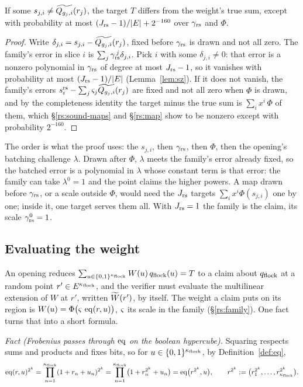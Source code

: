 \begin{lemma}\label{lem:rs-family}
If some $s_{j,i}\neq\widetilde{Q_{g_j,i}}(r_j)$, the target $T$ differs from the weight's true sum, except with probability at most $(J_{\mathrm{rs}}-1)/|E|+2^{-160}$ over $\gamma_{\mathrm{rs}}$ and $\Phi$.
\end{lemma}
\begin{proof}
Write $\delta_{j,i}=s_{j,i}-\widetilde{Q_{g_j,i}}(r_j)$, fixed before $\gamma_{\mathrm{rs}}$ is drawn and not all zero. The family's error in slice $i$ is $\sum_j\gamma_{\mathrm{rs}}^{\,j}\delta_{j,i}$. Pick $i$ with some $\delta_{j,i}\neq0$: that error is a nonzero polynomial in $\gamma_{\mathrm{rs}}$ of degree at most $J_{\mathrm{rs}}-1$, so it vanishes with probability at most $(J_{\mathrm{rs}}-1)/|E|$ (Lemma~\ref{lem:sz}). If it does not vanish, the family's errors $s^{\mathrm{rs}}_{i}-\sum_j\varsigma_j\widetilde{Q_{g_j,i}}(r_j)$ are fixed and not all zero when $\Phi$ is drawn, and by the completeness identity the target minus the true sum is $\sum_ix^i\,\Phi$ of them, which \S\ref{rs:sound-maps} and \S\ref{rs:map} show to be nonzero except with probability $2^{-160}$.
\end{proof}

The order is what the proof uses: the $s_{j,i}$, then $\gamma_{\mathrm{rs}}$, then $\Phi$, then the opening's batching challenge $\lambda$. Drawn after $\Phi$, $\lambda$ meets the family's error already fixed, so the batched error is a polynomial in $\lambda$ whose constant term is that error: the family can take $\lambda^0=1$ and the point claims the higher powers. A map drawn before $\gamma_{\mathrm{rs}}$, or a scale outside $\Phi$, would need the $J_{\mathrm{rs}}$ targets $\sum_ix^i\Phi(s_{j,i})$ one by one; inside it, one target serves them all. With $J_{\mathrm{rs}}=1$ the family is the claim, its scale $\gamma_{\mathrm{rs}}^0=1$.

\subsection{Evaluating the weight}\label{rs:weight}

An opening reduces $\sum_{u\in\{0,1\}^{\kappa_{\mathrm{flock}}}}W(u)\,q_{\mathrm{flock}}(u)=T$ to a claim about $q_{\mathrm{flock}}$ at a random point $r'\in E^{\kappa_{\mathrm{flock}}}$, and the verifier must evaluate the multilinear extension of $W$ at $r'$, written $\widetilde{W}(r')$, by itself. The weight a claim puts on its region is $W(u)=\Phi\bigl(\varsigma\,\operatorname{eq}(r,u)\bigr)$, $\varsigma$ its scale in the family (\S\ref{rs:family}). One fact turns that into a short formula.

\emph{Fact (Frobenius passes through $\operatorname{eq}$ on the boolean hypercube).} Squaring respects sums and products and fixes bits, so for $u\in\{0,1\}^{\kappa_{\mathrm{flock}}}$, by Definition~\ref{def:eq},
\[
\operatorname{eq}(r,u)^{2^k}=\prod_{n=1}^{\kappa_{\mathrm{flock}}}(1+r_n+u_n)^{2^k}=\prod_{n=1}^{\kappa_{\mathrm{flock}}}\bigl(1+r_n^{2^k}+u_n\bigr)=\operatorname{eq}\bigl(r^{2^k},u\bigr),
\qquad r^{2^k}:=\bigl(r_1^{2^k},\dots,r_{\kappa_{\mathrm{flock}}}^{2^k}\bigr).
\]

